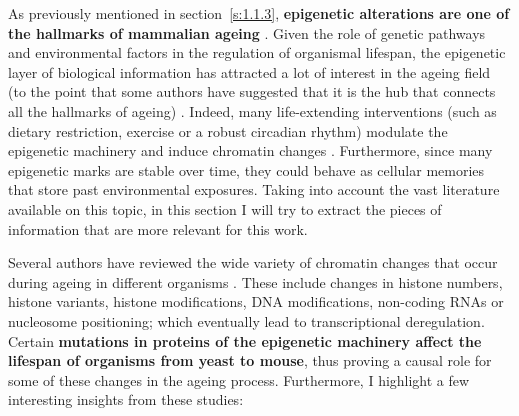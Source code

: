 As previously mentioned in section~\ref{s:1.1.3}, \textbf{epigenetic alterations are one of the hallmarks of mammalian ageing} \citep{Lopez-Otin2013}. Given the role of genetic pathways and environmental factors in the regulation of organismal lifespan, the epigenetic layer of biological information has attracted a lot of interest in the ageing field (to the point that some authors have suggested that it is the hub that connects all the hallmarks of ageing) \citep{Booth2016}. Indeed, many life-extending interventions (such as dietary restriction, exercise or a robust circadian rhythm) modulate the epigenetic machinery and induce chromatin changes \citep{Benayoun2015a}. Furthermore, since many epigenetic marks are stable over time, they could behave as cellular memories that store past environmental exposures. Taking into account the vast literature available on this topic, in this section I will try to extract the pieces of information that are more relevant for this work.

\bigskip

Several authors have reviewed the wide variety of chromatin changes that occur during ageing in different organisms \citep{Booth2016,Benayoun2015a,Pal2016,Sen2016}. These include changes in histone numbers, histone variants, histone modifications, DNA modifications, non-coding RNAs or nucleosome positioning; which eventually lead to transcriptional deregulation. Certain \textbf{mutations in proteins of the epigenetic machinery affect the lifespan of organisms from yeast to mouse}, thus proving a causal role for some of these changes in the ageing process. Furthermore, I highlight a few interesting insights from these studies:

